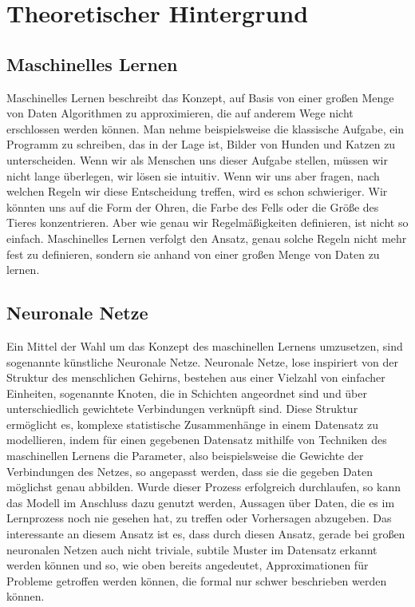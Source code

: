 \section{Theoretischer Hintergrund}
\subsection{Maschinelles Lernen}
Maschinelles Lernen beschreibt das Konzept, auf Basis von einer großen Menge von Daten Algorithmen zu approximieren, die auf anderem Wege nicht erschlossen werden können. Man nehme beispielsweise die klassische Aufgabe, ein Programm zu schreiben, das in der Lage ist, Bilder von Hunden und Katzen zu unterscheiden. Wenn wir als Menschen uns dieser Aufgabe stellen, müssen wir nicht lange überlegen, wir lösen sie intuitiv. Wenn wir uns aber fragen, nach welchen Regeln wir diese Entscheidung treffen, wird es schon schwieriger. Wir könnten uns auf die Form der Ohren, die Farbe des Fells oder die Größe des Tieres konzentrieren. Aber wie genau wir Regelmäßigkeiten definieren, ist nicht so einfach. Maschinelles Lernen verfolgt den Ansatz, genau solche Regeln nicht mehr fest zu definieren, sondern sie anhand von einer großen Menge von Daten zu lernen.

\subsection{Neuronale Netze}
Ein Mittel der Wahl um das Konzept des maschinellen Lernens umzusetzen, sind sogenannte künstliche Neuronale Netze. Neuronale Netze, lose inspiriert von der Struktur des menschlichen Gehirns, bestehen aus einer Vielzahl von einfacher Einheiten, sogenannte Knoten, die in Schichten angeordnet sind und über unterschiedlich gewichtete Verbindungen verknüpft sind. Diese Struktur ermöglicht es, komplexe statistische Zusammenhänge in einem Datensatz zu modellieren, indem für einen gegebenen Datensatz mithilfe von Techniken des maschinellen Lernens die Parameter, also beispielsweise die Gewichte der Verbindungen des Netzes, so angepasst werden, dass sie die gegeben Daten möglichst genau abbilden. Wurde dieser Prozess erfolgreich durchlaufen, so kann das Modell im Anschluss dazu genutzt werden, Aussagen über Daten, die es im Lernprozess noch nie gesehen hat, zu treffen oder Vorhersagen abzugeben. Das interessante an diesem Ansatz ist es, dass durch diesen Ansatz, gerade bei großen neuronalen Netzen auch nicht triviale, subtile Muster im Datensatz erkannt werden können und so, wie oben bereits angedeutet, Approximationen für Probleme getroffen werden können, die formal nur schwer beschrieben werden können.

